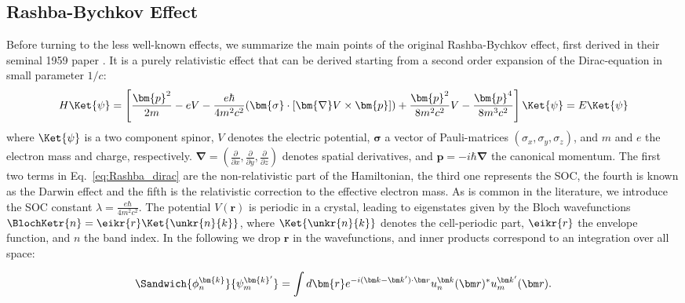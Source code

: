 \subsection{Rashba-Bychkov Effect \label{sec:Rashba_relativistic}}
Before turning to the less well-known effects, we summarize the main points of the original Rashba-Bychkov effect, first derived in their seminal 1959 paper \cite{Rashba1959SymmetryAr}.
It is a purely relativistic effect that can be derived starting from a second order expansion of the Dirac-equation in small parameter $1/c$:
\begin{equation}
	\label{eq:Rashba_dirac}
	H \Ket{\psi} = \left[\frac{\bm{p}^2}{2m} - e V - \frac{e \hbar}{4m^2c^2}(\bm{\sigma}\cdot[\bm{\nabla}V \times \bm{p}]) + \frac{\bm{p}^2}{8m^2c^2} V - \frac{\bm{p}^4}{8m^3c^2}\right]\Ket{\psi} = E\Ket{\psi}
\end{equation}
where $\Ket{\psi}$ is a two component spinor, $V$ denotes the electric potential, $\bm{\sigma}$ a vector of Pauli-matrices $(\sigma_x, \sigma_y, \sigma_z)$, and $m$ and $e$ the electron mass and charge, respectively.
$\bm \nabla = (\frac{\partial}{\partial x}, \frac{\partial}{\partial y}, \frac{\partial }{\partial z})$ denotes spatial derivatives, and $\bm{p} = -i\hbar \bm{\nabla}$ the canonical momentum.
The first two terms in Eq.~\eqref{eq:Rashba_dirac} are the non-relativistic part of the Hamiltonian, the third one represents the SOC, the fourth is known as the Darwin effect and the fifth is the relativistic correction to the effective electron mass. 
As is common in the literature, we introduce the SOC constant $\lambda = \frac{e \hbar}{4m^2c^2}$.
The potential $V(\bm r)$ is periodic in a crystal, leading to eigenstates given by the Bloch wavefunctions $\BlochKetr{n} = \eikr{r} \Ket{\unkr{n}{k}}$, where $\Ket{\unkr{n}{k}}$ denotes the cell-periodic part, $\eikr{r}$ the envelope function, and $n$ the band index.
In the following we drop $\bm{r}$ in the wavefunctions, and inner products correspond to an integration over all space:

\begin{equation}
	\Sandwich{\phi_n^{\bm{k}}}{\psi_m^{\bm{k}'}} = \int d\bm{r} e^{-i (\bm k - \bm k') \cdot \bm r} u_n^{\bm k }(\bm r)^* u_m^{\bm k'}(\bm r).
\end{equation}

